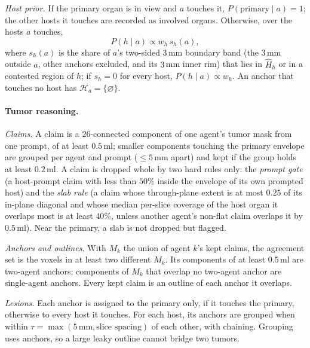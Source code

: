 \documentclass[fleqn,10pt]{olplainarticle}
\begin{document}
\emph{Host prior.} If the primary organ is in view and $a$ touches it, $P(\text{primary}\mid a)=1$; the other hosts it
touches are recorded as involved organs. Otherwise, over the hosts $a$ touches,
\begin{equation}
\label{eq:host_prior}
P(h\mid a)\propto w_h\,s_h(a),
\end{equation}
where $s_h(a)$ is the share of $a$'s two-sided $3$\,mm boundary band (the $3$\,mm outside $a$, other anchors excluded, and its
$3$\,mm inner rim) that lies in $\hat H_h$ or in a contested region of $h$; if $s_h=0$ for every host, $P(h\mid a)\propto w_h$. An anchor that touches no host
has $\mathcal{H}_a=\{\varnothing\}$.

\paragraph{Tumor reasoning.}
\label{sec:tumor_details}
\emph{Claims.} A claim is a $26$-connected component of one agent's tumor mask from one prompt, of at least $0.5$\,ml; smaller
components touching the primary envelope are grouped per agent and prompt ($\le5$\,mm apart) and kept if the group holds at
least $0.2$\,ml. A claim is dropped whole by two hard rules only: the \emph{prompt gate} (a host-prompt claim with less than
$50\%$ inside the envelope of its own prompted host) and the \emph{slab rule} (a claim whose through-plane extent is at most
$0.25$ of its in-plane diagonal and whose median per-slice coverage of the host organ it overlaps most is at least $40\%$,
unless another agent's non-flat claim overlaps it by $0.5$\,ml). Near the primary, a slab is not dropped but flagged.

\emph{Anchors and outlines.} With $M_k$ the union of agent $k$'s kept claims, the agreement set is the voxels in at least two
different $M_k$. Its components of at least $0.5$\,ml are two-agent anchors; components of $M_k$ that overlap no two-agent
anchor are single-agent anchors. Every kept claim is an outline of each anchor it overlaps.

\emph{Lesions.} Each anchor is assigned to the primary only, if it touches the primary, otherwise to every host it touches.
For each host, its anchors are grouped when within $\tau=\max(5\,\mathrm{mm},\text{slice spacing})$ of each other, with
chaining. Grouping uses anchors, so a large leaky outline cannot bridge two tumors.
\end{document}
